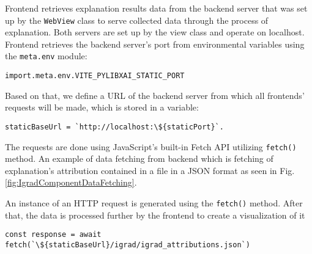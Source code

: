 \documentclass[
    bindingoffset=5mm,  %
    footnoteindent=3mm, %
    hyphenation=true    %
]{src/wut-thesis}
\begin{document}
Frontend retrieves explanation results data from the backend server that was set up by the
\texttt{WebView} class to serve collected data through the process of explanation.
Both servers are set up by the view class and operate on localhost. 
Frontend retrieves the backend server's port from environmental variables using the \texttt{meta.env}
module:
\begin{verbatim}
import.meta.env.VITE_PYLIBXAI_STATIC_PORT
\end{verbatim}

Based on that, we define a URL of the backend server from which all frontends’ requests
will be made, which is stored in a variable:
\begin{verbatim}
staticBaseUrl = `http://localhost:\${staticPort}`.
\end{verbatim}
The requests are done using JavaScript's built-in Fetch API utilizing \texttt{fetch()} method.
An example of data fetching from backend which is fetching of explanation's attribution
contained in a file in a JSON format as seen in Fig. \ref{fig:IgradComponentDataFetching}.

An instance of an HTTP request is generated using the \texttt{fetch()} method. After that, the data is processed further by the frontend to create a visualization of it
\begin{verbatim}
const response = await fetch(`\${staticBaseUrl}/igrad/igrad_attributions.json`)
\end{verbatim}
\end{document}
